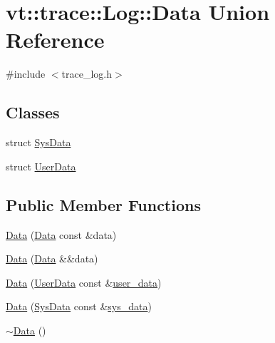 \hypertarget{unionvt_1_1trace_1_1_log_1_1_data}{}\section{vt\+:\+:trace\+:\+:Log\+:\+:Data Union Reference}
\label{unionvt_1_1trace_1_1_log_1_1_data}


{\ttfamily \#include $<$trace\+\_\+log.\+h$>$}

\subsection*{Classes}
\begin{DoxyCompactItemize}
\item 
struct \hyperlink{structvt_1_1trace_1_1_log_1_1_data_1_1_sys_data}{Sys\+Data}
\item 
struct \hyperlink{structvt_1_1trace_1_1_log_1_1_data_1_1_user_data}{User\+Data}
\end{DoxyCompactItemize}
\subsection*{Public Member Functions}
\begin{DoxyCompactItemize}
\item 
\hyperlink{unionvt_1_1trace_1_1_log_1_1_data_a8361a2cf0feb1a5c238766ce0608d8c2}{Data} (\hyperlink{unionvt_1_1trace_1_1_log_1_1_data}{Data} const \&data)
\item 
\hyperlink{unionvt_1_1trace_1_1_log_1_1_data_ad53002e880d4c931f76c62485e2d798a}{Data} (\hyperlink{unionvt_1_1trace_1_1_log_1_1_data}{Data} \&\&data)
\item 
\hyperlink{unionvt_1_1trace_1_1_log_1_1_data_aa76f0f5895f20a4b607e2666b2ad944e}{Data} (\hyperlink{structvt_1_1trace_1_1_log_1_1_data_1_1_user_data}{User\+Data} const \&\hyperlink{structvt_1_1trace_1_1_log_a7b251bc7dcebcbbafa29cc2ca6ea4c12}{user\+\_\+data})
\item 
\hyperlink{unionvt_1_1trace_1_1_log_1_1_data_ae94b837f6aa6d25ad87df4b05f089ed9}{Data} (\hyperlink{structvt_1_1trace_1_1_log_1_1_data_1_1_sys_data}{Sys\+Data} const \&\hyperlink{structvt_1_1trace_1_1_log_a082937c397ac5b47ffc9089ff94698f0}{sys\+\_\+data})
\item 
\hyperlink{unionvt_1_1trace_1_1_log_1_1_data_a756ed898d9a1df126b2e214050f158e1}{$\sim$\+Data} ()
\end{DoxyCompactItemize}
